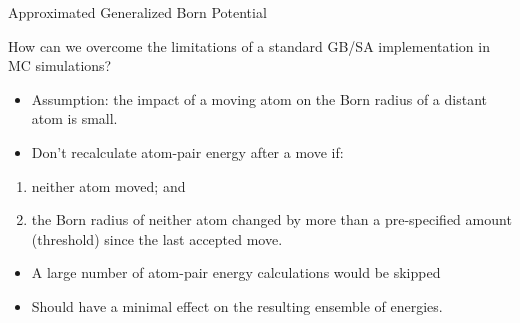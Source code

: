 \documentclass[10pt]{beamer}
\begin{document}
\begin{frame}{Approximated Generalized Born Potential}

How can we overcome the limitations of a standard GB/SA implementation in MC simulations?

\begin{itemize}
    \item Assumption: the impact of a moving atom on the Born radius of a distant atom is small. 
    \item Don’t recalculate atom-pair energy after a move if:
\end{itemize}

\begin{enumerate}
    \item neither atom moved; and
    \item the Born radius of neither atom changed by more than a pre-specified amount (threshold) since the last accepted move.
\end{enumerate}

\begin{itemize}
    \item A large number of atom-pair energy calculations would be skipped 
    \item Should have a minimal effect on the resulting ensemble of energies.
\end{itemize} 
\end{frame}

\end{document}
